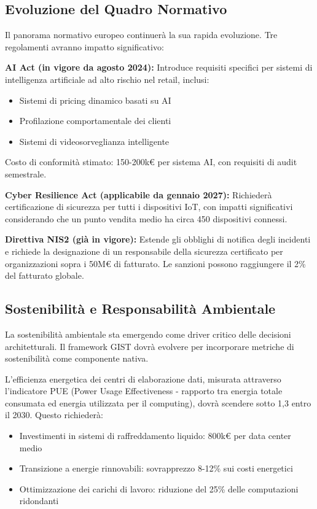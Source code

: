 \subsection{\texorpdfstring{\textbf{Evoluzione del Quadro Normativo}}{5.5.2 - Evoluzione del Quadro Normativo}}
\label{subsec:5.5.2}

Il panorama normativo europeo continuerà la sua rapida evoluzione. Tre regolamenti avranno impatto significativo:

\textbf{AI Act (in vigore da agosto 2024):} Introduce requisiti specifici per sistemi di intelligenza artificiale ad alto rischio nel retail, inclusi:
\begin{itemize}
\item Sistemi di pricing dinamico basati su AI
\item Profilazione comportamentale dei clienti
\item Sistemi di videosorveglianza intelligente
\end{itemize}

Costo di conformità stimato: 150-200k€ per sistema AI, con requisiti di audit semestrale.

\textbf{Cyber Resilience Act (applicabile da gennaio 2027):} Richiederà certificazione di sicurezza per tutti i dispositivi IoT, con impatti significativi considerando che un punto vendita medio ha circa 450 dispositivi connessi.

\textbf{Direttiva NIS2 (già in vigore):} Estende gli obblighi di notifica degli incidenti e richiede la designazione di un responsabile della sicurezza certificato per organizzazioni sopra i 50M€ di fatturato. Le sanzioni possono raggiungere il 2\% del fatturato globale.

\subsection{\texorpdfstring{\textbf{Sostenibilità e Responsabilità Ambientale}}{5.5.3 - Sostenibilità e Responsabilità Ambientale}}
\label{subsec:5.5.3}

La sostenibilità ambientale sta emergendo come driver critico delle decisioni architetturali. Il framework GIST dovrà evolvere per incorporare metriche di sostenibilità come componente nativa.

L'efficienza energetica dei centri di elaborazione dati, misurata attraverso l'indicatore PUE (Power Usage Effectiveness - rapporto tra energia totale consumata ed energia utilizzata per il computing), dovrà scendere sotto 1,3 entro il 2030. Questo richiederà:
\begin{itemize}
\item Investimenti in sistemi di raffreddamento liquido: 800k€ per data center medio
\item Transizione a energie rinnovabili: sovrapprezzo 8-12\% sui costi energetici
\item Ottimizzazione dei carichi di lavoro: riduzione del 25\% delle computazioni ridondanti
\end{itemize}

